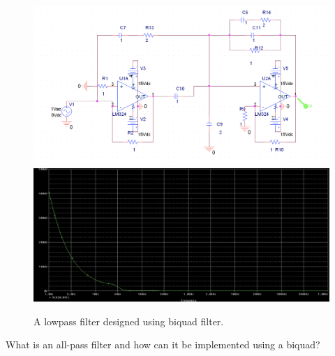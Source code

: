 \documentclass[11pt]{article}
\begin{document}
\begin{question}
\begin{subquestion}
{            \begin{figure}[H]
                \begin{center}
                    \includegraphics[scale=0.3]{Fig/Q6da.png}
                    \includegraphics[scale=0.25]{Fig/Q6db.png}
                    \caption{A lowpass filter designed using biquad filter.}
                \end{center}
            \end{figure}
        }
    \end{subquestion}
    \begin{subquestion}{What is an all-pass filter and how can it be implemented using a biquad?}
\end{subquestion}
\end{question}
\end{document}
